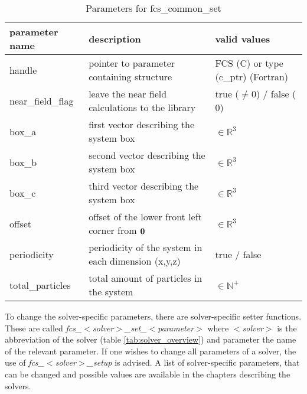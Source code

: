 \begin{table}
\begin{center}
\begin{tabular}{|p{}|p{}|p{}|}
          \hline
          parameter name        &       description                                         &   valid values                        \\
          \hline
          handle                &       pointer to parameter containing structure           &   FCS (C) or type (c\_ptr) (Fortran)   \\
          \hline
          near\_field\_flag    &       leave the near field calculations to the library    &   true ($\neq 0$) / false ($0$)       \\
          \hline
          box\_a                &       first vector describing the system box              &   $\in \mathbb{R}^3$                  \\
          \hline
          box\_b                &       second vector describing the system box             &   $\in \mathbb{R}^3$                  \\
          \hline
          box\_c                &       third vector describing the system box              &   $\in \mathbb{R}^3$                  \\
          \hline
          offset                &       offset of the lower front left corner from $\mathbf{0}$&   $\in \mathbb{R}^3$                  \\
          \hline
          periodicity           &       periodicity of the system in each dimension (x,y,z) &   true / false                        \\
          \hline
          total\_particles      &       total amount of particles in the system             &   $\in \mathbb{N}^+$                  \\
          \hline 
\end{tabular}
\end{center}
\caption{Parameters for fcs\_common\_set}
\label{tab:fcs_set_common_parameters}
\end{table}

To change the solver-specific parameters, there are solver-specific setter functions. These are called \textit{fcs\_$<$solver$>$\_set\_$<$parameter$>$} where 
\textit{$<$solver$>$} is the abbreviation of the solver (table \ref{tab:solver_overview}) and parameter the name of the relevant parameter. If one wishes to change all parameters of
a solver, the use of \textit{fcs\_$<$solver$>$\_setup} is advised. A list of solver-specific parameters, that can be changed and possible values are available
in the chapters describing the solvers.

